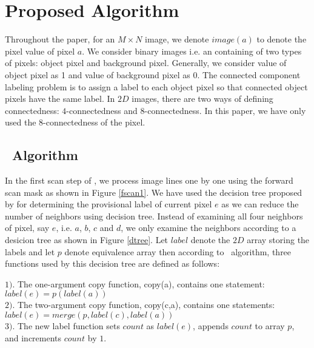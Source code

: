 \section{Proposed Algorithm}
\label{sec:proposed_algorithm}

Throughout the paper, for an $M \times N$ image, we denote $image(a)$ to denote the pixel value of pixel $a$.
We consider binary images i.e. an containing of two types of pixels: object pixel and 
background pixel. Generally, we consider value of object pixel as 1 and value of background pixel as 0. The connected
component labeling problem is to assign a label to each object pixel so that connected object pixels have the same label.
In $2D$ images, there are two ways of defining connectedness: $4$-connectedness and $8$-connectedness. In this paper, we have 
only used the $8$-connectedness of the pixel.


\vspace{3mm}
\subsection{\remsp\ Algorithm}


In the first scan step of \remsp, we process image lines one by one using the
forward scan mask as shown in Figure \ref{fscan1}. We have used the decision 
tree proposed by \cite{Wu2009_LRPC} for determining the provisional label of current pixel
$e$ as we can reduce the number of neighbors using decision tree. Instead of
examining all four neighbors of pixel, say $e$, i.e. $a$, $b$, $c$ and $d$, we only
examine the neighbors according to a desicion tree as shown in Figure \ref{dtree}.
 Let $label$ denote the $2D$ array storing the labels and let $p$ denote equivalence array 
 then according to \lrpc\ algorithm,
three functions used by this decision tree are defined as follows:

$1)$. The one-argument copy function, copy(a), contains one statement:
					$label(e) = p(label(a))$\\
$2)$. The two-argument copy function, copy(c,a), contains one statements:
				$label(e) = merge(p, label(c), label(a))$\\
$3)$. The new label function sets $count$ as $label(e)$, appends $count$ to array $p$, and increments $count$ by $1$.



